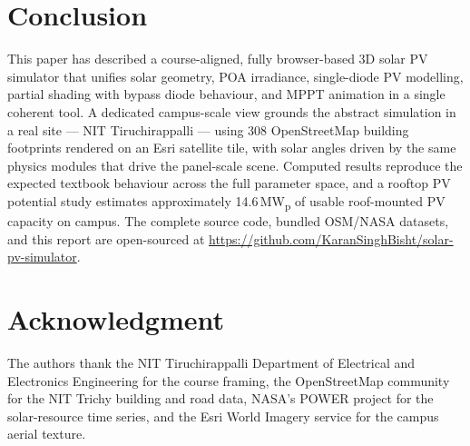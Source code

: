 \documentclass[conference]{IEEEtran}
\begin{document}
\section{Conclusion}
This paper has described a course-aligned, fully browser-based 3D solar PV simulator that unifies solar geometry, POA irradiance, single-diode PV modelling, partial shading with bypass diode behaviour, and MPPT animation in a single coherent tool. A dedicated campus-scale view grounds the abstract simulation in a real site --- NIT Tiruchirappalli --- using 308 OpenStreetMap building footprints rendered on an Esri satellite tile, with solar angles driven by the same physics modules that drive the panel-scale scene. Computed results reproduce the expected textbook behaviour across the full parameter space, and a rooftop PV potential study estimates approximately 14.6\,MW\textsubscript{p} of usable roof-mounted PV capacity on campus. The complete source code, bundled OSM/NASA datasets, and this report are open-sourced at \url{https://github.com/KaranSinghBisht/solar-pv-simulator}.

\section*{Acknowledgment}
The authors thank the NIT Tiruchirappalli Department of Electrical and Electronics Engineering for the course framing, the OpenStreetMap community for the NIT Trichy building and road data, NASA's POWER project for the solar-resource time series, and the Esri World Imagery service for the campus aerial texture.
\end{document}
